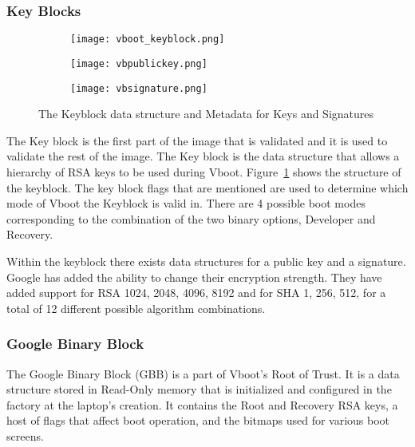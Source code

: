 \documentclass[../report.tex]{subfiles}
\begin{document}
\subsubsection{Key Blocks}

\begin{figure}
\begin{subfigure}{.5\textwidth}
  \centering
  \texttt{[image: vboot\_keyblock.png]}
\end{subfigure}
\begin{subfigure}{.20\textwidth}
  \centering
  \texttt{[image: vbpublickey.png]}
\end{subfigure}
\begin{subfigure}{.20\textwidth}
  \centering
  \texttt{[image: vbsignature.png]}
\end{subfigure}
\caption{The Keyblock data structure and Metadata for Keys and Signatures}
\label{fig:vboot_keyblock}
\end{figure}

The Key block is the first part of the image that is validated and it is used to validate the rest of the image.
The Key block is the data structure that allows a hierarchy of RSA keys to be used during Vboot.
Figure~\ref{fig:vboot_keyblock} shows the structure of the keyblock. 
The key block flags that are mentioned are used to determine which mode of Vboot the Keyblock is valid in. 
There are 4 possible boot modes corresponding to the combination of the two binary options, Developer and Recovery.

Within the keyblock there exists data structures for a public key and a signature.
Google has added the ability to change their encryption strength.
They have added support for RSA 1024, 2048, 4096, 8192 and for SHA 1, 256, 512, for a total of 12 different possible algorithm combinations.

\subsubsection{Google Binary Block}

The Google Binary Block (GBB) is a part of Vboot's Root of Trust.
It is a data structure stored in Read-Only memory that is initialized and configured in the factory at the laptop's creation.
It contains the Root and Recovery RSA keys, a host of flags that affect boot operation, and the bitmaps used for various boot screens.
\end{document}
